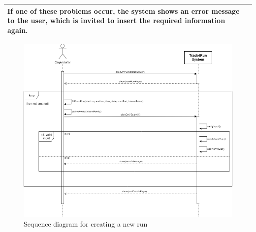 \begin{table}[H]
\begin{tabular}{|p{3.5cm}|p{10.3cm}|}
If one of these problems occur, the system shows an error message to the user, which is invited to insert the required information again.\\
    
    \hline
    
    \end{tabular}
	
\end{table}

\begin{figure}[H]
    \centering
    \includegraphics[scale=0.4]{Pictures/createNewRunSeqDiag.png}
    \caption{Sequence diagram for creating a new run}
\end{figure}
